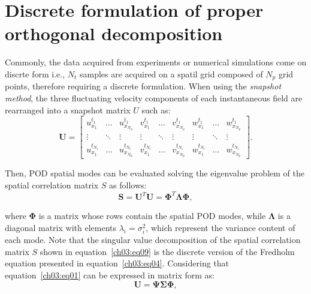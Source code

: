 \section{Discrete formulation of proper orthogonal decomposition}\label{ch03:s2}

Commonly, the data acquired from experiments or numerical simulations come on discrte form i.e., $N_t$ samples are acquired on a spatil grid composed of $N_p$ grid points, therefore requiring a discrete formulation.
When using the \textit{snapshot method}, the three fluctuating velocity components of each instantaneous field are rearranged into a snapshot matrix $U$ such as:
\begin{equation}
    \mathbf{U}=\begin{bmatrix}
    u_{x_1}^{t_1} & \dots  & u_{x_{N_p}}^{t_1} & v_{x_1}^{t_1} & \dots  & v_{x_{N_p}}^{t_1} & w_{x_1}^{t_1} & \dots  & w_{x_{N_p}}^{t_1}\\
    \vdots         & \ddots & \vdots         & \vdots         & \ddots & \vdots  & \vdots         & \ddots & \vdots \\
    u_{x_1}^{t_{N_t}} & \dots  & u_{x_{N_p}}^{t_{N_t}} & v_{x_1}^{t_{N_t}} & \dots  & v_{x_{N_p}}^{t_{N_t}}  & w_{x_1}^{t_{N_t}} & \dots  & w_{x_{N_p}}^{t_{N_t}}
    \end{bmatrix}.
    \label{ch03:eq08}
\end{equation}

Then, POD spatial modes can be evaluated solving the eigenvalue problem of the spatial correlation matrix $S$ as follows:
\begin{equation}
    \mathbf{S}=\mathbf{U}^T\mathbf{U}=\boldsymbol{\Phi}^T\boldsymbol{\Lambda}\boldsymbol{\Phi},
    \label{ch03:eq09}
\end{equation}

\noindent where $\boldsymbol{\Phi}$ is a matrix whose rows contain the spatial POD modes, while $\boldsymbol{\Lambda}$ is a diagonal matrix with elements $\lambda_i=\sigma_i^2$, which represent the variance content of each mode.
Note that the singular value decomposition of the spatial correlation matrix $S$ shown in equation~\ref{ch03:eq09} is the discrete version of the Fredholm equation presented in equation~\ref{ch03:eq04}.
Considering that equation~\ref{ch03:eq01} can be expressed in matrix form as:
\begin{equation}
  \boldsymbol{U} =  \boldsymbol{\Psi}\boldsymbol{\Sigma}\boldsymbol{\Phi},
  \label{ch03:eq10}
\end{equation}

